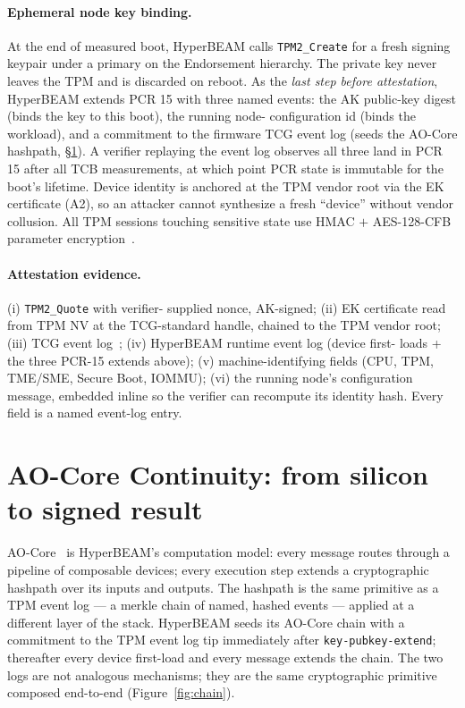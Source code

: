 \documentclass[10pt,a4paper]{article}
\begin{document}
\paragraph{Ephemeral node key binding.} At the end of measured boot,
HyperBEAM calls \texttt{TPM2\_Create} for a fresh signing keypair under
a primary on the Endorsement hierarchy. The private key never leaves
the TPM and is discarded on reboot. As the \emph{last step before
attestation}, HyperBEAM extends PCR 15 with three named events: the AK
public-key digest (binds the key to this boot), the running node-
configuration id (binds the workload), and a commitment to the firmware
TCG event log (seeds the AO-Core hashpath, \S\ref{sec:aocore}). A
verifier replaying the event log observes all three land in PCR 15
after all TCB measurements, at which point PCR state is immutable for
the boot's lifetime. Device identity is anchored at the TPM vendor root
via the EK certificate (A2), so an attacker cannot synthesize a fresh
``device'' without vendor collusion. All TPM sessions touching
sensitive state use HMAC $+$ AES-128-CFB parameter
encryption~\cite{tcg-tpm2}.

\paragraph{Attestation evidence.} (i) \texttt{TPM2\_Quote} with verifier-
supplied nonce, AK-signed; (ii) EK certificate read from TPM NV at the
TCG-standard handle, chained to the TPM vendor root; (iii) TCG event
log~\cite{tcg-pcclient}; (iv) HyperBEAM runtime event log (device first-
loads + the three PCR-15 extends above); (v) machine-identifying fields
(CPU, TPM, TME/SME, Secure Boot, IOMMU); (vi) the running node's
configuration message, embedded inline so the verifier can recompute its
identity hash. Every field is a named event-log entry.

\vspace{-0.3em}
\section{AO-Core Continuity: from silicon to signed result}
\label{sec:aocore}
\vspace{-0.3em}

AO-Core~\cite{ao-core} is HyperBEAM's computation model: every message
routes through a pipeline of composable devices; every execution step
extends a cryptographic hashpath over its inputs and outputs. The hashpath
is the same primitive as a TPM event log --- a merkle chain of named,
hashed events --- applied at a different layer of the stack. HyperBEAM
seeds its AO-Core chain with a commitment to the TPM event log tip
immediately after \texttt{key-pubkey-extend}; thereafter every device
first-load and every message extends the chain. The two logs are not
analogous mechanisms; they are the same cryptographic primitive composed
end-to-end (Figure~\ref{fig:chain}).
\end{document}
